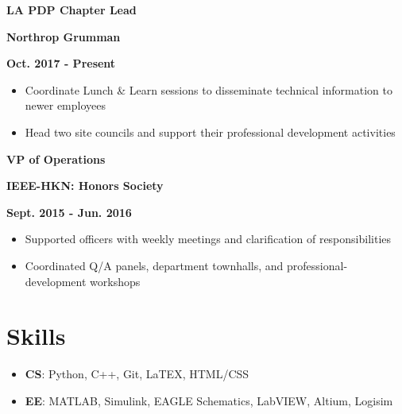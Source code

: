 \documentclass[12pt]{article}
\newcommand\textbox[1]{\parbox{.333\textwidth}{#1}}
\newcommand{\textlcr}[3]{\textbox{\textbf{#1}\hfill}\textbox{\hfil \textbf{#2}\hfil}\textbox{\hfill \textbf{#3}}}
\begin{document}
\textlcr{LA PDP Chapter Lead}{Northrop Grumman}{Oct. 2017 - Present}
\begin{itemize}
\item Coordinate Lunch \& Learn sessions to disseminate technical information to newer employees
\item Head two site councils and support their professional development activities
\end{itemize}

\bigskip
\textlcr{VP of Operations}{IEEE-HKN: Honors Society}{Sept. 2015 - Jun. 2016}
\begin{itemize}
\item Supported officers with weekly meetings and clarification of responsibilities
\item Coordinated Q/A panels, department townhalls, and professional-development workshops
\end{itemize}

\section*{Skills}
\vspace*{-1em}\makebox[\linewidth]{\rule{\textwidth}{0.4pt}}
\begin{itemize}
\item \textbf{CS}: Python, C++, Git, LaTEX, HTML/CSS
\item \textbf{EE}: MATLAB, Simulink, EAGLE Schematics, LabVIEW,  Altium, Logisim
\end{itemize}
\end{document}
